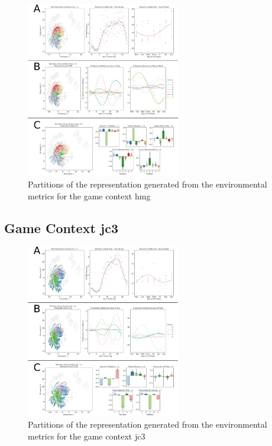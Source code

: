 \begin{figure}[!htb]
\includegraphics[width=0.6\textwidth]{images/appendix_D/clust_hmg_env.png}
\centering
\caption[Partitions of the representation generated from the environmental metrics for the game context hmg]{Partitions of the representation generated from the environmental metrics for the game context hmg}
\end{figure}
\FloatBarrier

\subsection{Game Context jc3}
\label{env_clust_jc3}

\begin{figure}[!htb]
\includegraphics[width=0.6\textwidth]{images/appendix_D/clust_env_jc3.png}
\centering
\caption[Partitions of the representation generated from the environmental metrics for the game context jc3]{Partitions of the representation generated from the environmental metrics for the game context jc3}
\end{figure}
\FloatBarrier

